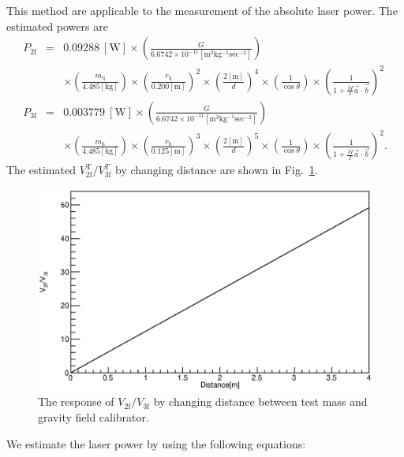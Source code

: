 \documentclass[A4]{spie}  %
\begin{document}
This method are applicable to the measurement of the absolute laser power. The estimated powers are
\begin{eqnarray}
P_{\mathrm{2f}}&=&0.09288 ~\mathrm{[W]}\times \left( \frac{G}{6.6742 \times 10^{-11} \mathrm{[m^3kg^{-1}sec^{-2}]}} \right) \nonumber \\
&& \times \left( \frac{m_{\mathrm{q}}}{4.485 \mathrm{[kg]}} \right) \times \left( \frac{r_{\mathrm{q}}}{0.200 \mathrm{[m]}} \right)^2 \times \left( \frac{2\mathrm{[m]}}{d} \right)^4 \times \left( \frac{1}{\cos{\theta}} \right) \times \left( \frac{1}{1+\frac{M}{I}\vec{a}\cdot \vec{b}} \right)^2\\
P_{\mathrm{3f}}&=&0.003779~\mathrm{[W]} \times \left( \frac{G}{6.6742 \times 10^{-11} \mathrm{[m^3kg^{-1}sec^{-2}]}} \right) \nonumber \\
&& \times \left( \frac{m_{\mathrm{h}}}{4.485 \mathrm{[kg]}} \right) \times \left( \frac{r_{\mathrm{h}}}{0.125 \mathrm{[m]}} \right)^3 \times \left( \frac{2\mathrm{[m]}}{d} \right)^5 \times \left( \frac{1}{\cos{\theta}} \right) \times \left( \frac{1}{1+\frac{M}{I}\vec{a}\cdot \vec{b}} \right)^2.
\end{eqnarray}
The estimated $V^{\mathrm{T}}_{\mathrm{2f}}/V^{T}_{\mathrm{3f}}$ by changing distance are shown in Fig.~\ref{fig:dvsVV}.
\begin{figure}
\begin{center}
\includegraphics[width=12cm]{dvsVV.eps}
\caption{The response of $V_{\mathrm{2f}}/V_{\mathrm{3f}}$ by changing distance between test mass and gravity field calibrator.}
\label{fig:dvsVV}
\end{center}
\end{figure}
We  estimate the laser power by using the following equations:
\end{document}
